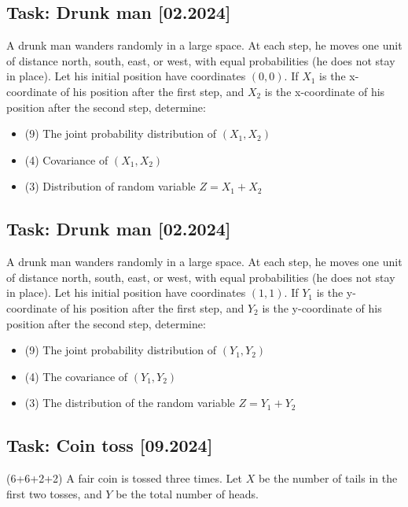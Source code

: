 \documentclass[a4paper, 12pt]{article}
\begin{document}
\subsection*{Task: Drunk man [02.2024]}

A drunk man wanders randomly in a large space. At each step, he moves one unit of distance north, south, east, or west, with equal probabilities (he does not stay in place). Let his initial position have coordinates $(0,0)$. If $X_1$ is the x-coordinate of his position after the first step, and $X_2$ is the x-coordinate of his position after the second step, determine:

\begin{itemize}
    \item [a)] (9) The joint probability distribution of $(X_1, X_2)$
\item [b)] (4) Covariance of $(X_1, X_2)$
\item [c)] (3) Distribution of random variable $Z = X_1 + X_2$
\end{itemize}



\subsection*{Task: Drunk man [02.2024]}

A drunk man wanders randomly in a large space. At each step, he moves one unit of distance north, south, east, or west, with equal probabilities (he does not stay in place). Let his initial position have coordinates $(1,1)$. If $Y_1$ is the y-coordinate of his position after the first step, and $Y_2$ is the y-coordinate of his position after the second step, determine:

\begin{itemize}
    \item [a)] (9) The joint probability distribution of $(Y_1, Y_2)$
\item [b)] (4) The covariance of $(Y_1, Y_2)$
\item [c)] (3) The distribution of the random variable $Z = Y_1 + Y_2$
\end{itemize}


\subsection*{Task: Coin toss [09.2024]}

(6+6+2+2) A fair coin is tossed three times. Let $X$ be the number of tails in the first two tosses, and $Y$ be the total number of heads.
\end{document}

